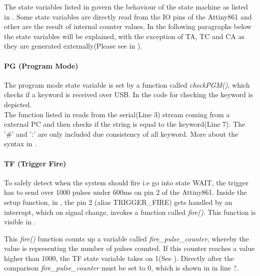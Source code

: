\noindent The state variables listed in  govern the behaviour of the state machine as listed in . Some state variables are directly read from the IO pins of the Attiny861 and other are  the result of internal counter values. In the following paragraphs below the state variables will be explained, with the exception of TA, TC and CA as they are generated externally(Please see  in ). \\

\pagebreak

\paragraph{PG (Program Mode)}
The program mode state variable is set by a function called \textit{checkPGM()}, which checks if a keyword is received over USB. In  the code for checking the keyword is depicted.\\



\noindent The function listed in  reads from the serial(Line 3) stream coming from a external PC and then checks if the string is equal to the keyword(Line 7). The '\#' and ':' are only included due consistency of all keyword. More about the syntax in .

\paragraph{TF (Trigger Fire)}

To safely detect when the system should fire i.e go into state WAIT, the trigger has to send over 1000 pulses under 600ms on pin 2 of the Attiny861. Inside the setup function, in , the pin 2 (alias TRIGGER\_FIRE) gets handled by an interrupt, which on signal change, invokes a function called \textit{fire()}. This function is visible in .



\noindent This \textit{fire()} function counts up a variable called \textit{fire\_pulse\_counter}, whereby the value is representing the number of pulses counted. If this counter reaches a value higher than 1000, the TF state variable takes on 1(See ). Directly after the comparison \textit{fire\_pulse\_counter} must be set to 0, which is shown in  in line ?.

